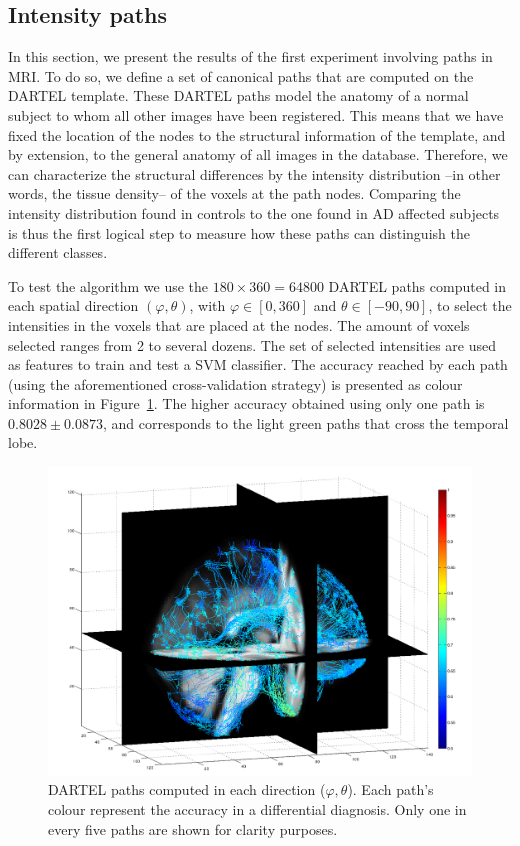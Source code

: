 \subsection{Intensity paths}\label{sec:intensity}
In this section, we present the results of the first experiment involving paths in MRI. To do so, we define a set of canonical paths that are computed on the DARTEL template. These DARTEL paths model the anatomy of a normal subject to whom all other images have been registered. This means that we have fixed the location of the nodes to the structural information of the template, and by extension, to the general anatomy of all images in the database. Therefore, we can characterize the structural differences by the intensity distribution --in other words, the tissue density--  of the voxels at the path nodes. Comparing the intensity distribution found in controls to the one found in AD affected subjects is thus the first logical step to measure how these paths can distinguish the different classes.

To test the algorithm we use the $180\times360=64800$ DARTEL paths computed in each spatial direction $(\varphi,\theta)$, with $\varphi\in[0,360]$ and $\theta\in[-90,90]$, to select the intensities in the voxels that are placed at the nodes. The amount of voxels selected ranges from 2 to several dozens. The set of selected intensities are used as features to train and test a SVM classifier. The accuracy reached by each path (using the aforementioned cross-validation strategy) is presented as colour information in Figure~\ref{fig:accuracyMap}. The higher accuracy obtained using only one path is $0.8028\pm0.0873$, and corresponds to the light green paths that cross the temporal lobe. 

\begin{figure}
	\begin{center}
		\includegraphics[width=\columnwidth]{gfx/ch6/accuracyPaths2}
		\caption{DARTEL paths computed in each direction ($\varphi,\theta$). Each path's colour represent the accuracy in a differential diagnosis. Only one in every five paths are shown for clarity purposes.}
		\label{fig:accuracyMap}
	\end{center}
\end{figure}

